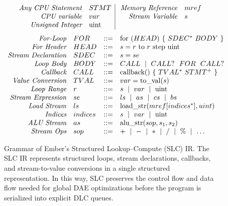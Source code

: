 \begin{figure}
  \normalsize
\[
\begin{array}{rl|@{\hspace{1.5\arraycolsep}}rl}
\textit{Any CPU Statement} & STMT &
\textit{Memory Reference} & mref \\
\textit{CPU variable} & var &
\textit{Stream Variable} & s \\
\textit{Unsigned Integer} & \text{uint} \\
\end{array}
\]
\[
\begin{array}{rlrl}
  \textit{For-Loop} & FOR & \mathrel{::=} & \text{for } (HEAD) \text{ \{ } SDEC^* ~ BODY \text{ \} }\\
  \textit{For Header} & HEAD & \mathrel{::=} & s = r \text{ to } r \text{ step } \text{uint} \\
  \textit{Stream Declaration} & SDEC  & \mathrel{::=} & s = se \\
  \textit{Loop Body} & BODY & \mathrel{::=} & CALL ~\mathrel{\mid}~ CALL? ~~ FOR ~~ CALL? \\
  \textit{Callback} & CALL & \mathrel{::=} & \text{callback()} \text{ \{ } TVAL^*~ STMT^+ \text{ \}} \\
  \textit{Value Conversion} & TVAL & \mathrel{::=} & var = \text{to\_val}(s) \\
  \textit{Loop Range} & r & \mathrel{::=} &  s ~\mathrel{\mid}~ var ~\mathrel{\mid}~ \text{uint}  \\
  \textit{Stream Expression} & se & \mathrel{::=} & ls~\mathrel{\mid}~as~\mathrel{\mid}~cs~\mathrel{\mid}~bs \\
  \textit{Load Stream} & ls  & \mathrel{::=} & \text{load\_str} (mref[indices^*], uint) \\
  \textit{Indices} & indices & \mathrel{::=} & s~\mathrel{\mid}~var~\mathrel{\mid}~ \text{uint} \\
  \textit{ALU Stream} & as & \mathrel{::=} & \text{alu\_str} (sop, s_1, s_2) \\
  \textit{Stream Ops} & sop  & \mathrel{::=} & +~\mathrel{\mid}~-~\mathrel{\mid}~*~\mathrel{\mid}~ 
/~\mathrel{\mid}~\%~\mathrel{\mid}~ \ldots  \\
\end{array}
\]
  \caption[SLC IR grammar.]{Grammar of Ember's Structured Lookup--Compute (SLC) IR. The SLC IR represents structured loops, stream declarations, callbacks, and stream-to-value conversions in a single structured representation. In this way, SLC preserves the control flow and data flow needed for global DAE optimizations before the program is serialized into explicit DLC queues.}
  \label{fig:ember-slc-ir-grammar}
\end{figure}
